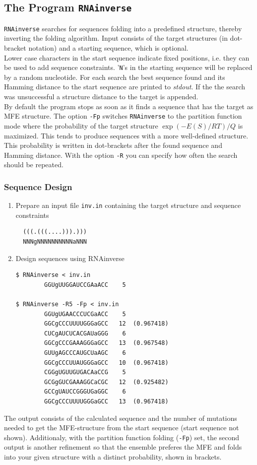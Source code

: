 \documentclass[a4paper]{article}
\newcommand{\frametitle}[1]{\subsubsection{#1}}
\begin{document}
\subsection{The Program \texttt{RNAinverse}}
\texttt{RNAinverse} searches for sequences folding into a predefined
structure, thereby inverting the folding algorithm. Input consists of the
target structures (in dot-bracket notation) and a starting sequence, 
which is optional.\\

Lower case characters in the start sequence indicate fixed positions,
i.e. they can be used to add sequence constraints. '\texttt{N}'s in the
starting sequence will be replaced by a random nucleotide.
For each search the best sequence found and its Hamming distance to the
start sequence are printed to \textit{stdout}. If the the search was
unsuccessful a structure distance to the target is appended.\\

By default the program stops as soon as it finds a sequence that has the
target as MFE structure. The option \texttt{-Fp} switches
\texttt{RNAinverse} to the partition function mode where the probability of
the target structure $\exp(-E(S)/RT)/Q$ is maximized.  This tends to produce
sequences with a more well-defined structure.
This probability is written in dot-brackets after the found sequence and Hamming
distance. With the option \texttt{-R} you can specify how often the search
should be repeated.

  \frametitle{Sequence Design}

\begin{enumerate}
\item Prepare an input file \texttt{inv.in} containing the target
structure and sequence constraints
\begin{verbatim}
  (((.(((....))).)))
  NNNgNNNNNNNNNNaNNN
\end{verbatim}
\item Design sequences using RNAinverse
\begin{verbatim}
$ RNAinverse < inv.in
        GGUgUUGGAUCCGAaACC    5

$ RNAinverse -R5 -Fp < inv.in
        GGUgUGAACCCUCGaACC    5
        GGCgCCCUUUUGGGaGCC   12  (0.967418)
        CUCgAUCUCACGAUaGGG    6
        GGCgCCCGAAAGGGaGCC   13  (0.967548)
        GUUgAGCCCAUGCUaAGC    6
        GGCgCCCUUAUGGGaGCC   10  (0.967418)
        CGGgUGUUGUGACAaCCG    5
        GCGgGUCGAAAGGCaCGC   12  (0.925482)
        GCCgUAUCCGGGUGaGGC    6
        GGCgCCCUUUUGGGaGCC   13  (0.967418)

\end{verbatim}
\end{enumerate}
\noindent
The output consists of the calculated sequence and the number of mutations
needed to get the MFE-structure from the start sequence (start sequence not shown). 
Additionaly, with the partition function folding (\texttt{-Fp}) set, the second 
output is another refinement so that the ensemble preferes the MFE and folds 
into your given structure with a distinct probability, shown in brackets.\\
\end{document}
